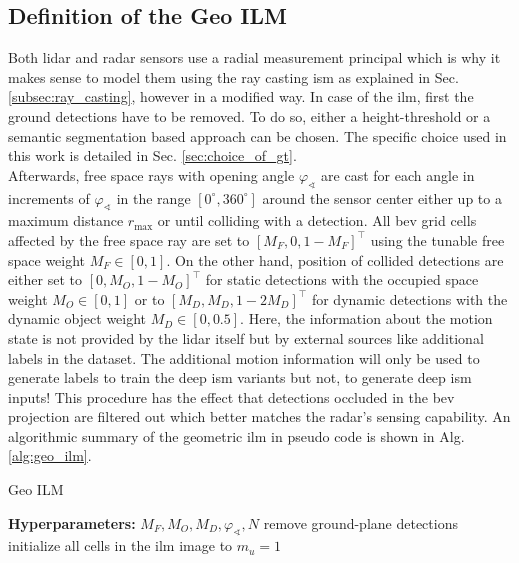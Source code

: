 \subsection{Definition of the Geo ILM}
\label{subsec:method_geo_ilm}
Both lidar and radar sensors use a radial measurement principal which is why it makes sense to model them using the ray casting \gls{ism} as explained in Sec. \ref{subsec:ray_casting}, however in a modified way. In case of the \gls{ilm}, first the ground detections have to be removed. To do so, either a height-threshold or a semantic segmentation based approach can be chosen. The specific choice used in this work is detailed in Sec. \ref{sec:choice_of_gt}.
\\
Afterwards, free space rays with opening angle $\varphi_\sphericalangle$ are cast for each angle in increments of $\varphi_\sphericalangle$ in the range $[0^\circ, 360^\circ]$ around the sensor center either up to a maximum distance $r_\text{max}$ or until colliding with a detection. All \gls{bev} grid cells affected by the free space ray are set to $[M_F,0,1-M_F]^\top$ using the tunable free space weight $M_F \in [0,1]$. On the other hand, position of collided detections are either set to $[0,M_O,1-M_O]^\top$ for static detections with the occupied space weight $M_O \in [0,1]$ or to $[M_D, M_D, 1-2M_D]^\top$ for dynamic detections with the dynamic object weight $M_D \in [0,0.5]$. Here, the information about the motion state is not provided by the lidar itself but by external sources like additional labels in the dataset. The additional motion information will only be used to generate labels to train the deep \gls{ism} variants but not, to generate deep \gls{ism} inputs! This procedure has the effect that detections occluded in the \gls{bev} projection are filtered out which better matches the radar's sensing capability. An algorithmic summary of the geometric \gls{ilm} in pseudo code is shown in Alg. \ref{alg:geo_ilm}.\\
\begin{algorithm}[H]
	\caption{\label{alg:geo_ilm}Geo ILM}
	\textbf{Hyperparameters:} $M_F, M_O, M_D, \varphi_\sphericalangle, N$\;
	remove ground-plane detections\;
	initialize all cells in the \gls{ilm} image to $m_u=1$\;
\end{algorithm}
%
